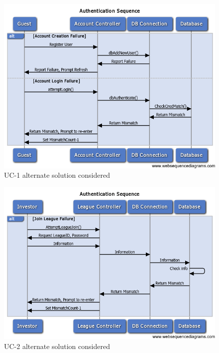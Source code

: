 \begin{figure}[H]
\centering
\includegraphics[width=5.5in]{./img/inter/alt1.png}
\caption{UC-1 alternate solution considered}
\end{figure}
\begin{figure}[H]
\centering
\includegraphics[width=5.5in]{./img/inter/alt2.png}
\caption{UC-2 alternate solution considered}
\end{figure}

